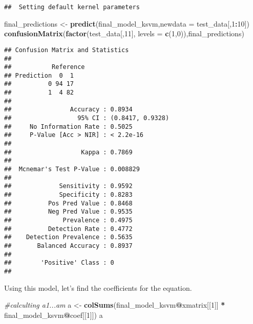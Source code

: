 \documentclass[
]{article}
\newenvironment{Shaded}{\begin{snugshade}}{\end{snugshade}}
\newcommand{\CommentTok}[1]{\textcolor[rgb]{0.56,0.35,0.01}{\textit{#1}}}
\newcommand{\DataTypeTok}[1]{\textcolor[rgb]{0.13,0.29,0.53}{#1}}
\newcommand{\DecValTok}[1]{\textcolor[rgb]{0.00,0.00,0.81}{#1}}
\newcommand{\KeywordTok}[1]{\textcolor[rgb]{0.13,0.29,0.53}{\textbf{#1}}}
\newcommand{\NormalTok}[1]{#1}
\newcommand{\OperatorTok}[1]{\textcolor[rgb]{0.81,0.36,0.00}{\textbf{#1}}}
\newcommand{\StringTok}[1]{\textcolor[rgb]{0.31,0.60,0.02}{#1}}
\begin{document}
\begin{verbatim}
##  Setting default kernel parameters
\end{verbatim}

\begin{Shaded}
\begin{Highlighting}[]
\NormalTok{final_predictions <-}\StringTok{ }\KeywordTok{predict}\NormalTok{(final_model_ksvm,}\DataTypeTok{newdata =}\NormalTok{ test_data[,}\DecValTok{1}\OperatorTok{:}\DecValTok{10}\NormalTok{])}
\KeywordTok{confusionMatrix}\NormalTok{(}\KeywordTok{factor}\NormalTok{(test_data[,}\DecValTok{11}\NormalTok{], }\DataTypeTok{levels =} \KeywordTok{c}\NormalTok{(}\DecValTok{1}\NormalTok{,}\DecValTok{0}\NormalTok{)),final_predictions)}
\end{Highlighting}
\end{Shaded}

\begin{verbatim}
## Confusion Matrix and Statistics
## 
##           Reference
## Prediction  0  1
##          0 94 17
##          1  4 82
##                                           
##                Accuracy : 0.8934          
##                  95% CI : (0.8417, 0.9328)
##     No Information Rate : 0.5025          
##     P-Value [Acc > NIR] : < 2.2e-16       
##                                           
##                   Kappa : 0.7869          
##                                           
##  Mcnemar's Test P-Value : 0.008829        
##                                           
##             Sensitivity : 0.9592          
##             Specificity : 0.8283          
##          Pos Pred Value : 0.8468          
##          Neg Pred Value : 0.9535          
##              Prevalence : 0.4975          
##          Detection Rate : 0.4772          
##    Detection Prevalence : 0.5635          
##       Balanced Accuracy : 0.8937          
##                                           
##        'Positive' Class : 0               
## 
\end{verbatim}

Using this model, let's find the coefficients for the equation.

\begin{Shaded}
\begin{Highlighting}[]
\CommentTok{#calculting a1...am}
\NormalTok{a <-}\StringTok{ }\KeywordTok{colSums}\NormalTok{(final_model_ksvm}\OperatorTok{@}\NormalTok{xmatrix[[}\DecValTok{1}\NormalTok{]] }\OperatorTok{*}\StringTok{ }\NormalTok{final_model_ksvm}\OperatorTok{@}\NormalTok{coef[[}\DecValTok{1}\NormalTok{]])}
\NormalTok{a}
\end{Highlighting}
\end{Shaded}
\end{document}
